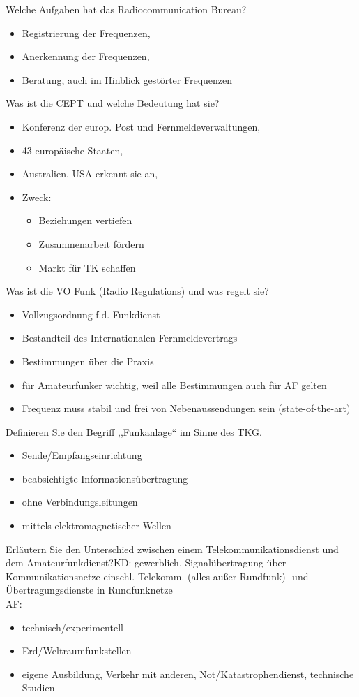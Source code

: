 \documentclass[avery5371,grid,frame,a4paper]{flashcards}
\newcommand{\card}[3]{
  \begin{flashcard}[{\chap} -- #1]{#2}#3\end{flashcard}
}
\begin{document}
\card{04}{Welche Aufgaben hat das Radiocommunication Bureau?}{\begin{itemize}\itemsep1pt \item Registrierung der Frequenzen, \item Anerkennung der Frequenzen, \item Beratung, auch im Hinblick gestörter Frequenzen
 \end{itemize}}
\card{05}{Was ist die CEPT und welche Bedeutung hat sie?}{\begin{itemize}\itemsep1pt \item	Konferenz der europ. Post und Fernmeldeverwaltungen, \item 43 europäische Staaten, \item Australien, USA erkennt sie an, \item Zweck: \begin{itemize}\itemsep1pt \item Beziehungen vertiefen \item Zusammenarbeit fördern \item Markt für TK schaffen \end{itemize} \end{itemize}}

\card{06}{Was ist die VO Funk (Radio Regulations) und was regelt sie?}{\begin{itemize}\itemsep1pt \item	Vollzugsordnung f.d. Funkdienst \item	Bestandteil des Internationalen Fernmeldevertrags \item Bestimmungen über die Praxis \item für Amateurfunker wichtig, weil alle Bestimmungen auch für AF gelten \item	Frequenz muss stabil und frei von Nebenaussendungen sein (state-of-the-art) \end{itemize}}

\card{07}{Definieren Sie den Begriff ,,Funkanlage`` im Sinne des TKG.}{\begin{itemize}\itemsep1pt \item	Sende/Empfangseinrichtung \item beabsichtigte Informationsübertragung \item	ohne Verbindungsleitungen \item	mittels elektromagnetischer Wellen \end{itemize}}

\card{08}{Erläutern Sie den Unterschied zwischen einem Telekommunikationsdienst und dem Amateurfunkdienst?}{KD: gewerblich, Signalübertragung über Kommunikationsnetze einschl. Telekomm. (alles außer Rundfunk)- und	Übertragungsdienste in Rundfunknetze \\ AF: \begin{itemize}\itemsep1pt \item technisch/experimentell \item Erd/Weltraumfunkstellen \item	eigene Ausbildung, Verkehr mit anderen, Not/Katastrophendienst, technische Studien \end{itemize}}
\end{document}

